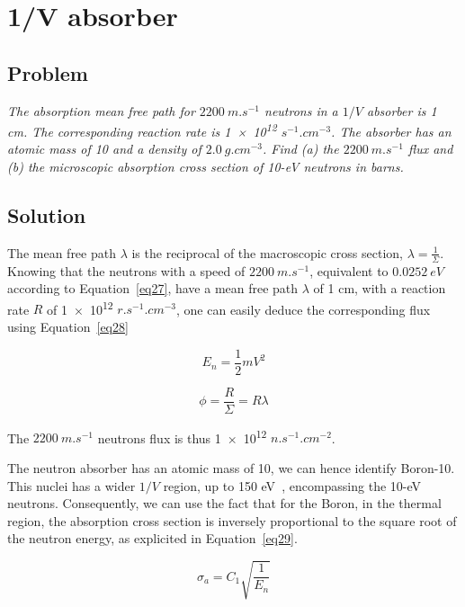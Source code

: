 \section{1/V absorber}
\label{prob22}

\subsection{Problem}
\textit{The absorption mean free path for $2200\ m.s^{-1}$ neutrons in a $1/V$ absorber is 1 cm. The corresponding reaction rate is \num{1e12} $s^{-1}.cm^{-3}$. The absorber has an atomic mass of 10 and a density of $2.0\ g.cm^{-3}$. Find (a) the $2200\ m.s^{-1}$ flux and (b) the microscopic absorption cross section of 10-eV neutrons in barns.}

\subsection{Solution}

The mean free path $\lambda$ is the reciprocal of the macroscopic cross section, $\lambda = \frac{1}{\Sigma}$. Knowing that the neutrons with a speed of $2200\ m.s^{-1}$, equivalent to $0.0252\ eV$ according to Equation~\ref{eq27}, have a mean free path $\lambda$ of 1 cm, with a reaction rate $R$ of \num{1e12} $r.s^{-1}.cm^{-3}$, one can easily deduce the corresponding flux using Equation~\ref{eq28}

\begin{equation}\label{eq27}
E_n = \frac{1}{2}mV^2
\end{equation}


\begin{equation}\label{eq28}
\phi = \frac{R}{\Sigma} = R\lambda
\end{equation}

The $2200\ m.s^{-1}$ neutrons flux is thus \num{1e12} $n.s^{-1}.cm^{-2}$.

The neutron absorber has an atomic mass of 10, we can hence identify Boron-10. This nuclei has a wider $1/V$ region, up to 150 eV~\cite{book01}, encompassing the 10-eV neutrons. Consequently, we can use the fact that for the Boron, in the thermal region, the absorption cross section is inversely proportional to the square root of the neutron energy, as explicited in Equation~\ref{eq29}.


\begin{equation}\label{eq29}
\sigma_a = C_1 \sqrt{\frac{1}{E_n}}
\end{equation}

